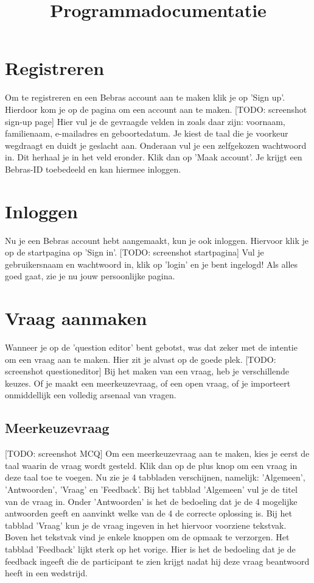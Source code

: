 \documentclass[]{article}
\title{
    Programmadocumentatie
}
\begin{document}
\maketitle

\section{Registreren}
Om te registreren en een Bebras account aan te maken klik je op 'Sign up'. Hierdoor kom je op de pagina om een account aan te maken. [TODO: screenshot sign-up page] Hier vul je de gevraagde velden in zoals daar zijn: voornaam, familienaam, e-mailadres en geboortedatum. Je kiest de taal die je voorkeur wegdraagt en duidt je geslacht aan. Onderaan vul je een zelfgekozen wachtwoord in. Dit herhaal je in het veld eronder. Klik dan op 'Maak account'. Je krijgt een Bebras-ID toebedeeld en kan hiermee inloggen.

\section{Inloggen}
Nu je een Bebras account hebt aangemaakt, kun je ook inloggen. Hiervoor klik je op de startpagina op 'Sign in'. [TODO: screenshot startpagina] Vul je gebruikersnaam en wachtwoord in, klik op 'login' en je bent ingelogd! Als alles goed gaat, zie je nu jouw persoonlijke pagina.

\section{Vraag aanmaken}
Wanneer je op de 'question editor' bent gebotst, was dat zeker met de intentie om een vraag aan te maken. Hier zit je alvast op de goede plek. [TODO: screenshot questioneditor] Bij het maken van een vraag, heb je verschillende keuzes. Of je maakt een meerkeuzevraag, of een open vraag, of je importeert onmiddellijk een volledig arsenaal van vragen. 

\subsection{Meerkeuzevraag}

[TODO: screenshot MCQ] Om een meerkeuzevraag aan te maken, kies je eerst de taal waarin de vraag wordt gesteld. Klik dan op de plus knop om een vraag in deze taal toe te voegen. Nu zie je 4 tabbladen verschijnen, namelijk: 'Algemeen', 'Antwoorden', 'Vraag' en 'Feedback'. Bij het tabblad 'Algemeen' vul je de titel van de vraag in. Onder 'Antwoorden' is het de bedoeling dat je de 4 mogelijke antwoorden geeft en aanvinkt welke van de 4 de correcte oplossing is. Bij het tabblad 'Vraag' kun je de vraag ingeven in het hiervoor voorziene tekstvak. Boven het tekstvak vind je enkele knoppen om de opmaak te verzorgen. Het tabblad 'Feedback' lijkt sterk op het vorige. Hier is het de bedoeling dat je de feedback ingeeft die de participant te zien krijgt nadat hij deze vraag beantwoord heeft in een wedstrijd. 
\end{document}

